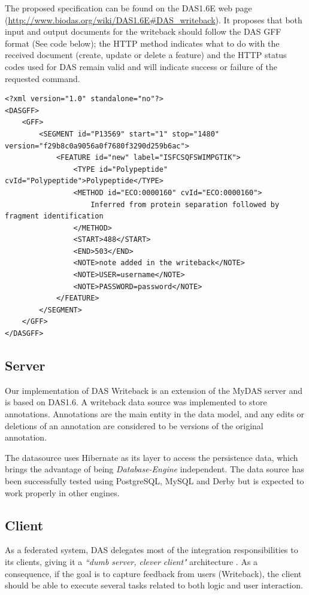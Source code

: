 The proposed specification can be found on the DAS1.6E web page (\url{http://www.biodas.org/wiki/DAS1.6E\#DAS\_writeback}). It proposes that both input and output documents for the writeback should follow the DAS GFF format (See code below); the HTTP method indicates what to do with the received document (create, update or delete a feature) and the HTTP status codes used for DAS remain valid and will indicate success or failure of the requested command.

\newpage
\begin{lstlisting}
<?xml version="1.0" standalone="no"?>
<DASGFF>
	<GFF>
		<SEGMENT id="P13569" start="1" stop="1480" version="f29b8c0a9056a0f7680f3290d259b6ac">
			<FEATURE id="new" label="ISFCSQFSWIMPGTIK">
				<TYPE id="Polypeptide" cvId="Polypeptide">Polypeptide</TYPE>
				<METHOD id="ECO:0000160" cvId="ECO:0000160">
					Inferred from protein separation followed by fragment identification
				</METHOD>
				<START>488</START>
				<END>503</END>
				<NOTE>note added in the writeback</NOTE>
				<NOTE>USER=username</NOTE>
				<NOTE>PASSWORD=password</NOTE>
			</FEATURE>
		</SEGMENT>
	</GFF>
</DASGFF>
\end{lstlisting}

\subsection{Server}

Our implementation of DAS Writeback is an extension of the MyDAS server\cite{SAL2012} and is based on DAS1.6. A writeback data source was implemented to store annotations. Annotations are the main entity in the data model, and any edits or deletions of an annotation are considered to be versions of the original annotation.

The datasource uses Hibernate \cite{BAU2006} as its layer to access the persistence data, which brings the advantage of being \emph{Database-Engine} independent. The data source has been successfully tested using PostgreSQL, MySQL and Derby but is expected to work properly in other engines.

\subsection{Client}
As a federated system, DAS delegates most of the integration responsibilities to its clients, giving it a \emph{``dumb server, clever client"} architecture \cite{JEN2008}. As a consequence, if the goal is to capture feedback from users (Writeback), the client should be able to execute several tasks related to both logic and user interaction. 

